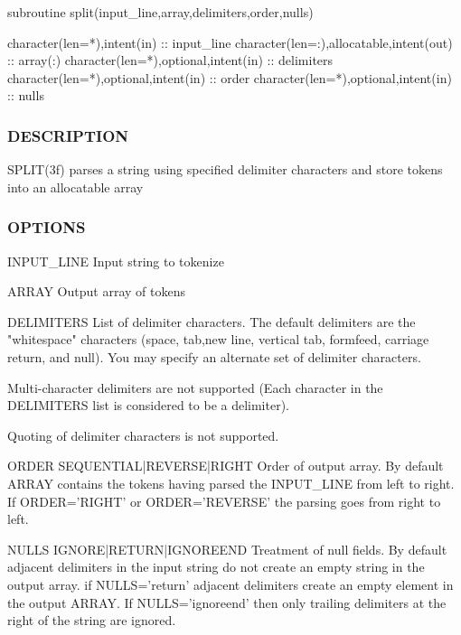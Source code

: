 \begin{DoxyVerb}subroutine split(input_line,array,delimiters,order,nulls)

 character(len=*),intent(in)              :: input_line
 character(len=:),allocatable,intent(out) :: array(:)
 character(len=*),optional,intent(in)     :: delimiters
 character(len=*),optional,intent(in)     :: order
 character(len=*),optional,intent(in)     :: nulls
\end{DoxyVerb}
 \subsubsection*{D\+E\+S\+C\+R\+I\+P\+T\+I\+ON}

S\+P\+L\+I\+T(3f) parses a string using specified delimiter characters and store tokens into an allocatable array

\subsubsection*{O\+P\+T\+I\+O\+NS}

\begin{DoxyVerb}INPUT_LINE  Input string to tokenize

ARRAY       Output array of tokens

DELIMITERS  List of delimiter characters.
            The default delimiters are the "whitespace" characters
            (space, tab,new line, vertical tab, formfeed, carriage
            return, and null). You may specify an alternate set of
            delimiter characters.

            Multi-character delimiters are not supported (Each
            character in the DELIMITERS list is considered to be
            a delimiter).

            Quoting of delimiter characters is not supported.

ORDER SEQUENTIAL|REVERSE|RIGHT  Order of output array.
            By default ARRAY contains the tokens having parsed
            the INPUT_LINE from left to right. If ORDER='RIGHT'
            or ORDER='REVERSE' the parsing goes from right to left.

NULLS IGNORE|RETURN|IGNOREEND  Treatment of null fields.
            By default adjacent delimiters in the input string
            do not create an empty string in the output array. if
            NULLS='return' adjacent delimiters create an empty element
            in the output ARRAY. If NULLS='ignoreend' then only
            trailing delimiters at the right of the string are ignored.
\end{DoxyVerb}


